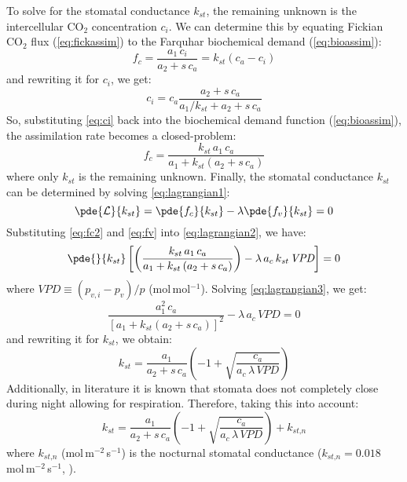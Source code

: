 To solve for the stomatal conductance $k_{st}$, the remaining unknown is the intercellular CO$_2$ concentration $c_i$. We can determine this by equating Fickian CO$_2$ flux (\cref{eq:fickassim}) to the Farquhar biochemical demand (\cref{eq:bioassim}):
\begin{equation}
f_c = \frac{a_1\,c_i}{a_2 + s\,c_a} = k_{st} \left(c_a - c_i\right)
\end{equation}
and rewriting it for $c_i$, we get:
\begin{equation}
c_i = c_a \frac{a_2 + s\,c_a}{a_1/k_{st} + a_2 + s\,c_a}
\label{eq:ci}
\end{equation}
So, substituting \cref{eq:ci} back into the biochemical demand function (\cref{eq:bioassim}), the assimilation rate becomes a closed-problem:
\begin{equation}
f_c = \frac{k_{st}\,a_1\,c_a}{a_1 + k_{st} \left(a_2 + s\,c_a\right)}
\label{eq:fc2}
\end{equation}
where only $k_{st}$ is the remaining unknown. Finally, the stomatal conductance $k_{\textit{st}}$ can be determined by solving \cref{eq:lagrangian1}:
\begin{equation}
\pde{\mathcal{L}}{k_{st}} = \pde{f_c}{k_{st}} - \lambda \pde{f_v}{k_{st}} = 0
\label{eq:lagrangian2}
\end{equation}
Substituting \cref{eq:fc2} and \cref{eq:fv} into \cref{eq:lagrangian2}, we have:
\begin{equation}
\pde{}{k_{st}} \left[ \left(\frac{k_{st}\, a_1 \,c_a}{a_1 + k_{st} \left(a_2 + s\, c_a\right)}\right)- \lambda\, a_c\, k_{\textit{st}}\, \textit{VPD} \right] = 0
\label{eq:lagrangian3}
\end{equation}
where $\textit{VPD} \equiv \left(p_{v,i} - p_v \right)/p$ (mol\,mol$^{-1}$). Solving \cref{eq:lagrangian3}, we get:
\begin{equation}
\frac{a_1^2\, c_a}{\left[a_1 + k_{st} \left(a_2 + s \,c_a\right)\right]^2}- \lambda\, a_c \,\textit{VPD} = 0
\end{equation}
and rewriting it for $k_{\textit{st}}$, we obtain:
\begin{equation}
k_{\textit{st}} = \frac{a_1}{a_2 + s\,c_a} \left( -1 + \sqrt{\frac{c_a}{a_c\, \lambda \,\textit{VPD}}} \right)
\label{eq:kst}
\end{equation}
Additionally, in literature it is known that stomata does not completely close during night allowing for respiration. Therefore, taking this into account:
\begin{equation}
k_{\textit{st}} = \frac{a_1}{a_2 + s\,c_a} \left( -1 + \sqrt{\frac{c_a}{a_c\, \lambda\, \textit{VPD}}} \right) + k_{\textit{st,n}}
\end{equation}
where $k_{\textit{st,n}}$ (mol\,m$^{-2}$\,s$^{-1}$) is the nocturnal stomatal conductance ($k_{\textit{st,n}} = 0.018$ mol\,m$^{-2}$\,s$^{-1}$, \citep{Manoli2014}). 

